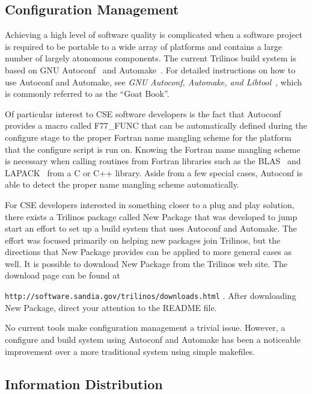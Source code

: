 \documentclass[12pt,relax]{article}
\newcommand{\InlineDirectory}[1]{
  {\hspace{0.01 in}} {\tt #1} {\hspace{0.01 in}}}
\begin{document}
\subsection{Configuration Management}


Achieving a high level of software quality is complicated when
a software project is required to be portable to a wide array of platforms 
and contains a large number of largely atonomous components.
The current Trilinos build system is based on GNU Autoconf~\cite{Autoconf} and
Automake~\cite{Automake}.  For detailed instructions on how to use Autoconf 
and Automake, see {\it GNU Autoconf, Automake, and Libtool}~\cite{GoatBook}, 
which is commonly referred to as the ``Goat Book''.

Of particular interest to CSE software developers is the fact that Autoconf
provides a macro called F77\_FUNC that can be
automatically defined during the configure stage to the proper Fortran
name mangling scheme for the platform that the configure script is run on.
Knowing the Fortran name mangling scheme is necessary when calling routines
from Fortran libraries such as the BLAS~\cite{BLAS1,BLAS2,BLAS3} and
LAPACK~\cite{lapack} from a C or C++ library.  Aside from a few special cases,
Autoconf is able to detect the proper name mangling scheme automatically.

For CSE developers interested in something closer to a plug and play solution,
there exists a Trilinos package called
New Package that was developed to jump start an effort to set up a
build system that uses Autoconf and Automake.  The effort was focused
primarily on helping new packages join Trilinos, but the directions that
New Package provides can be applied to more general cases as well.  
It is possible to download New Package from the
Trilinos web site.  The download page can be found at \newline
\InlineDirectory{http://software.sandia.gov/trilinos/downloads.html}.  After
downloading New Package, direct your attention to the README file.

No current tools make configuration management a trivial issue.  However, a
configure and build system using Autoconf and Automake has been a
noticeable improvement over a more traditional system using simple makefiles.

\subsection{Information Distribution}
\end{document}
